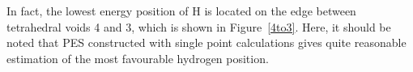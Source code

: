 In fact, the lowest energy position of H is located on the edge between tetrahedral voids 4 and 3, which is shown in  Figure~\ref{4to3}. Here, it should be noted that PES constructed with single point calculations gives quite reasonable estimation of the most favourable hydrogen position.

\begin{figure}[h]
\begin{minipage}[h]{0.3\linewidth}
\end{minipage}
\hfill
\begin{minipage}[h]{0.3\linewidth}

\end{minipage}
\end{figure}
